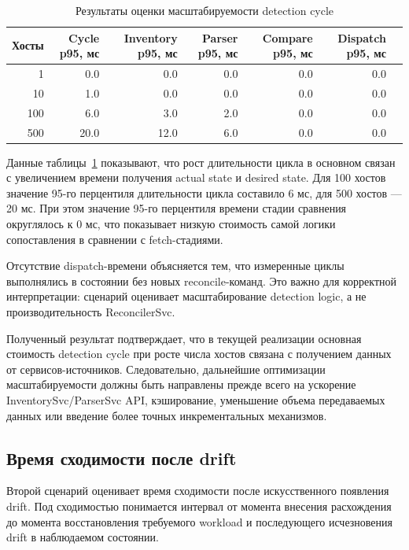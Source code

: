 \begin{table}
    \centering
    \caption{Результаты оценки масштабируемости detection cycle}
    \label{tab:ch4-detection-scalability}
    \footnotesize
    \begin{tabular}{|r|r|r|r|r|r|r|}\hline
    Хосты & Cycle p95, мс & Inventory p95, мс & Parser p95, мс & Compare p95, мс & Dispatch p95, мс \\ \hline
    1   & 0.0  & 0.0  & 0.0 & 0.0 & 0.0 \\ \hline
    10  & 1.0  & 0.0  & 0.0 & 0.0 & 0.0 \\ \hline
    100 & 6.0  & 3.0  & 2.0 & 0.0 & 0.0 \\ \hline
    500 & 20.0 & 12.0 & 6.0 & 0.0 & 0.0 \\ \hline
    \end{tabular}
    \normalsize
\end{table}

Данные таблицы~\ref{tab:ch4-detection-scalability} показывают, что рост длительности цикла в основном связан с увеличением времени получения actual state и desired state. Для 100 хостов значение 95-го перцентиля длительности цикла составило 6 мс, для 500 хостов --- 20 мс. При этом значение 95-го перцентиля времени стадии сравнения округлялось к 0 мс, что показывает низкую стоимость самой логики сопоставления в сравнении с fetch-стадиями.

Отсутствие dispatch-времени объясняется тем, что измеренные циклы выполнялись в состоянии без новых reconcile-команд. Это важно для корректной интерпретации: сценарий оценивает масштабирование detection logic, а не производительность ReconcilerSvc.

Полученный результат подтверждает, что в текущей реализации основная стоимость detection cycle при росте числа хостов связана с получением данных от сервисов-источников. Следовательно, дальнейшие оптимизации масштабируемости должны быть направлены прежде всего на ускорение InventorySvc/ParserSvc API, кэширование, уменьшение объема передаваемых данных или введение более точных инкрементальных механизмов.

\subsection{Время сходимости после drift}

Второй сценарий оценивает время сходимости после искусственного появления drift. Под сходимостью понимается интервал от момента внесения расхождения до момента восстановления требуемого workload и последующего исчезновения drift в наблюдаемом состоянии.

